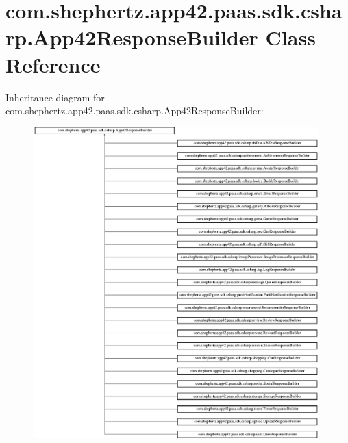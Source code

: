 \hypertarget{classcom_1_1shephertz_1_1app42_1_1paas_1_1sdk_1_1csharp_1_1_app42_response_builder}{\section{com.\+shephertz.\+app42.\+paas.\+sdk.\+csharp.\+App42\+Response\+Builder Class Reference}
\label{classcom_1_1shephertz_1_1app42_1_1paas_1_1sdk_1_1csharp_1_1_app42_response_builder}
}
Inheritance diagram for com.\+shephertz.\+app42.\+paas.\+sdk.\+csharp.\+App42\+Response\+Builder\+:\begin{figure}[H]
\begin{center}
\leavevmode
\includegraphics[height=12.000000cm]{classcom_1_1shephertz_1_1app42_1_1paas_1_1sdk_1_1csharp_1_1_app42_response_builder}
\end{center}
\end{figure}
